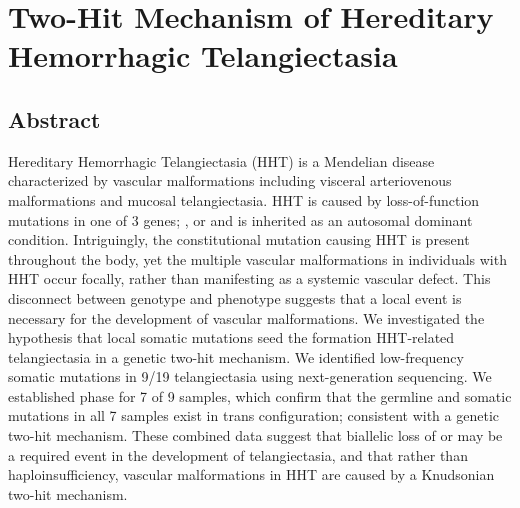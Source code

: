 \chapter{Two-Hit Mechanism of Hereditary Hemorrhagic Telangiectasia}
\label{chap:guide}

\section{Abstract}
Hereditary Hemorrhagic Telangiectasia (HHT) is a Mendelian disease characterized by vascular malformations including visceral arteriovenous malformations and mucosal telangiectasia. HHT is caused by loss-of-function mutations in one of 3 genes; ,  or  and is inherited as an autosomal dominant condition. Intriguingly, the constitutional mutation causing HHT is present throughout the body, yet the multiple vascular malformations in individuals with HHT occur focally, rather than manifesting as a systemic vascular defect. This disconnect between genotype and phenotype suggests that a local event is necessary for the development of vascular malformations. We investigated the hypothesis that local somatic mutations seed the formation HHT-related telangiectasia in a genetic two-hit mechanism. We identified low-frequency somatic mutations in 9/19 telangiectasia using next-generation sequencing. We established phase for 7 of 9 samples, which confirm that the germline and somatic mutations in all 7 samples exist in trans configuration; consistent with a genetic two-hit mechanism. These combined data suggest that biallelic loss of  or  may be a required event in the development of telangiectasia, and that rather than haploinsufficiency, vascular malformations in HHT are caused by a Knudsonian two-hit mechanism.

